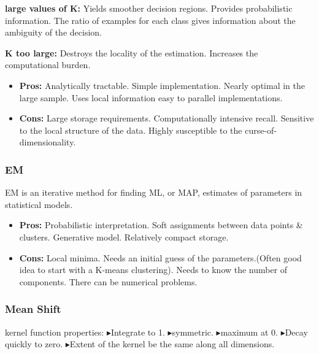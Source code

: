 \documentclass{../cheat}
\def \itm{{\tiny$\blacktriangleright$}}
\begin{document}
\begin{multicols}{3}
	\textbf{large values of K:}
	 Yields smoother decision regions.
	 Provides probabilistic information.
	 The ratio of examples for each class gives information about the ambiguity of the decision.
	
	\textbf{K too large:}
	 Destroys the locality of the estimation.
	 Increases the computational burden.
	
	\begin{itemize}[nolistsep, leftmargin=1em]
		\item \textbf{Pros:}
			 Analytically tractable.
			 Simple implementation.
			 Nearly optimal in the large sample.
			 Uses local information
			 easy to parallel implementations.
		\item \textbf{Cons:}
			 Large storage requirements.
			 Computationally intensive recall.
			 Sensitive to the local structure of the data.
			 Highly susceptible to the curse-of-dimensionality.
	\end{itemize}
	
	\subsubsection{EM}
	EM is an iterative method for finding ML, or MAP, estimates of parameters in statistical models.
	
	\begin{itemize}[nolistsep, leftmargin=1em]
		\item \textbf{Pros:}
			 Probabilistic interpretation.
			 Soft assignments between data points \& clusters.
			 Generative model.%
			 Relatively compact storage.
		\item \textbf{Cons:}
			 Local minima.
			 Needs an initial guess of the parameters.(Often good idea to start with a K-means clustering).
			 Needs to know the number of components.
			 There can be numerical problems.
	\end{itemize}
		
	\subsubsection{Mean Shift}
	kernel function properties: 
	\itm Integrate to 1.
	\itm symmetric.
	\itm maximum at 0.
	\itm Decay quickly to zero.
	\itm Extent of the kernel be the same along all dimensions.
	

\end{multicols}
\end{document}

